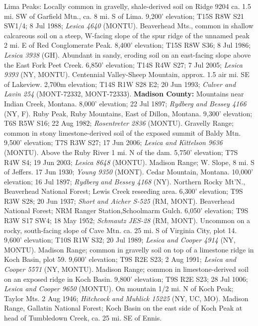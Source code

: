 Lima Peaks: Locally common in gravelly, shale-derived soil on Ridge 9204 ca.
1.5 mi. SW of Garfield Mtn., ca. 8 mi. S of Lima. 9,200' elevation;
T15S R8W S21 SW1/4; 8 Jul 1988; \textit{Lesica 4640} (MONTU).
Beaverhead Mts., common in shallow calcareous soil on a steep, W-facing slope
of the spur ridge of the unnamed peak 2 mi. E of Red Conglomerate Peak.
8,400’ elevation; T15S R8W S36; 8 Jul 1986; \textit{Lesica 3938} (GH).
Abundant in sandy, eroding soil on an east-facing slope above the East Fork
Peet Creek. 6,850’ elevation; T14S R4W S27; 7 Jul 2005;
\textit{Lesica 9393} (NY, MONTU).
Centennial Valley-Sheep Mountain, approx. 1.5 air mi. SE of Lakeview.
2,700m elevation; T14S R1W S28 E2; 20 Jun 1993;
\textit{Culver and Lavin 254} (MONT-72332, MONT-72333).
  \textbf{Madison County:}
Mountains near Indian Creek, Montana. 8,000’ elevation; 22 Jul 1897;
\textit{Rydberg and Bessey 4166} (NY, F).
Ruby Peak, Ruby Mountains, East of Dillon, Montana. 9,300’ elevation;
T6S R5W S16; 22 Aug 1982; \textit{Rosentreter 2836} (MONTU).
Gravelly Range; common in stony limestone-derived soil of the exposed summit of
Baldy Mtn. 9,500’ elevation; T7S R3W S27; 17 Jun 2006;
\textit{Lesica and Kittelson 9636} (MONTU).
Above the Ruby River 1 mi. N of the dam. 5,750' elevation; T7S R4W S4;
19 Jun 2003; \textit{Lesica 8648} (MONTU).
Madison Range; W. Slope, 8 mi. S of Jeffers. 17 Jun 1930;
\textit{Young 9350} (MONT).
Cedar Mountain, Montana. 10,000’ elevation; 16 Jul 1897;
\textit{Rydberg and Bessey 4168} (NY).
Northern Rocky Mt'N., Beaverhead National Forest; Lewis Creek reseeding area.
6,300’ elevation; T9S R3W S28; 20 Jun 1937;
\textit{Short and Aicher S-525} (RM, MONT).
Beaverhead National Forest; NRM Ranger Station,Schoolmarm Gulch.
6,050’ elevation; T9S R3W S17 SW4; 18 May 1952;
\textit{Schmautz JES-28} (RM, MONT).
Uncommon on a rocky, south-facing slope of Cave Mtn. ca. 25 mi. S of
Virginia City, plot 14. 9,600’ elevation; T10S R1W S32; 20 Jul 1989;
\textit{Lesica and Cooper 4914} (NY, MONTU).
Madison Range; common in gravelly soil on top of a limestone ridge in
Koch Basin, plot 59. 9,600’ elevation; T9S R2E S23; 2 Aug 1991;
\textit{Lesica and Cooper 5571} (NY, MONTU).
Madison Range; common in limestone-derived soil on an exposed ridge in
Koch Basin. 9,800’ elevation; T9S R2E S23; 28 Jul 1006;
\textit{Lesica and Cooper 9650} (MONTU).
On mountain 1/2 mi. N of Koch Peak; Taylor Mts. 2 Aug 1946;
\textit{Hitchcock and Muhlick 15225} (NY, UC, MO).
Madison Range, Gallatin National Forest; Koch Basin on the east side of
Koch Peak at head of Tumbledown Creek, ca. 25 mi. SE of Ennis.

